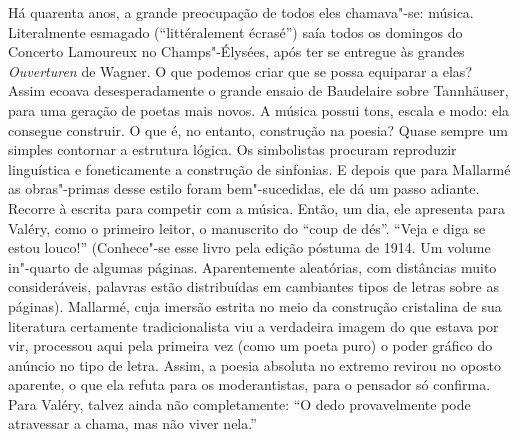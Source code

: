 Há quarenta anos, a grande preocupação de todos eles chamava"-se: música.
Literalmente esmagado (``littéralement écrasé'') saía todos os domingos
do Concerto Lamoureux no Champs"-Élysées, após ter se entregue às grandes
\emph{Ouverturen} de Wagner. O que podemos criar que se possa equiparar
a elas? Assim ecoava desesperadamente o grande ensaio de Baudelaire
sobre Tannhäuser, para uma geração de poetas mais novos. A música possui
tons, escala e modo: ela consegue construir. O que é, no entanto,
construção na poesia? Quase sempre um simples contornar a estrutura
lógica. Os simbolistas procuram reproduzir linguística e foneticamente a
construção de sinfonias. E depois que para Mallarmé as obras"-primas
desse estilo foram bem"-sucedidas, ele dá um passo adiante. Recorre à
escrita para competir com a música. Então, um dia, ele apresenta para
Valéry, como o primeiro leitor, o manuscrito do ``coup de dés''. ``Veja
e diga se estou louco!'' (Conhece"-se esse livro pela edição póstuma de
1914. Um volume in"-quarto de algumas páginas. Aparentemente aleatórias,
com distâncias muito consideráveis, palavras estão distribuídas em
cambiantes tipos de letras sobre as páginas). Mallarmé, cuja imersão
estrita no meio da construção cristalina de sua literatura certamente
tradicionalista viu a verdadeira imagem do que estava por vir, processou
aqui pela primeira vez (como um poeta puro) o poder gráfico do anúncio
no tipo de letra. Assim, a poesia absoluta no extremo revirou no oposto
aparente, o que ela refuta para os moderantistas, para o pensador só
confirma. Para Valéry, talvez ainda não completamente: ``O dedo
provavelmente pode atravessar a chama, mas não viver nela.''
